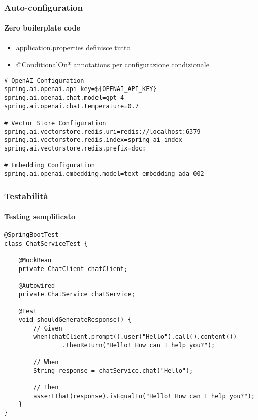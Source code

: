 %
\begin{frame}[t,fragile] \frametitle{Auto-configuration}
	{\small
		\framesubtitle{Zero boilerplate code}
		\begin{itemize}[leftmargin=10pt,align=right]
			\onslide<2->\item[\alert{\faHandORight}] \alert{application.properties} definisce tutto
			\onslide<3->\item[\alert{\faHandORight}] \alert{@ConditionalOn*} annotations per configurazione condizionale
		\end{itemize}
		\vspace*{.3cm}
\begin{verbatim}
# OpenAI Configuration
spring.ai.openai.api-key=${OPENAI_API_KEY}
spring.ai.openai.chat.model=gpt-4
spring.ai.openai.chat.temperature=0.7

# Vector Store Configuration  
spring.ai.vectorstore.redis.uri=redis://localhost:6379
spring.ai.vectorstore.redis.index=spring-ai-index
spring.ai.vectorstore.redis.prefix=doc:

# Embedding Configuration
spring.ai.openai.embedding.model=text-embedding-ada-002
\end{verbatim}
	}
\end{frame}
%
\begin{frame}[t,fragile] \frametitle{Testabilità}
	{\small
		\framesubtitle{Testing semplificato}
\begin{verbatim}
@SpringBootTest
class ChatServiceTest {
    
    @MockBean
    private ChatClient chatClient;
    
    @Autowired
    private ChatService chatService;
    
    @Test
    void shouldGenerateResponse() {
        // Given
        when(chatClient.prompt().user("Hello").call().content())
                .thenReturn("Hello! How can I help you?");
        
        // When  
        String response = chatService.chat("Hello");
        
        // Then
        assertThat(response).isEqualTo("Hello! How can I help you?");
    }
}
\end{verbatim}
	}
\end{frame}
%
